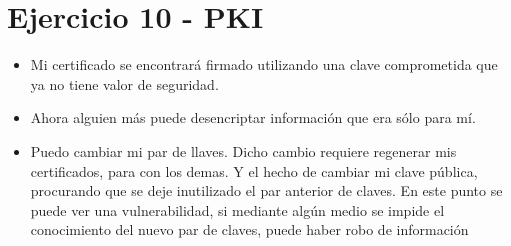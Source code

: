 \section{Ejercicio 10 - PKI}

\begin{itemize}
    \item Mi certificado se encontrará firmado utilizando una clave comprometida que ya no tiene valor de seguridad.
    \item Ahora alguien más puede desencriptar información que era sólo para mí.
    \item Puedo cambiar mi par de llaves. Dicho cambio requiere regenerar mis certificados, para con los demas. Y el hecho de cambiar mi clave pública, procurando que se deje inutilizado el par anterior de claves. En este punto se puede ver una vulnerabilidad, si mediante algún medio se impide el conocimiento del nuevo par de claves, puede haber robo de información
\end{itemize}
\clearpage
\printbibliography



